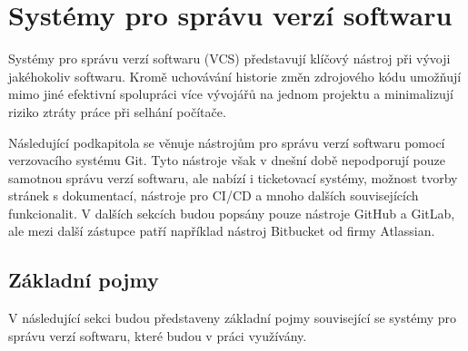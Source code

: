 \section{Systémy pro správu verzí softwaru}
Systémy pro správu verzí softwaru (VCS) představují klíčový nástroj při vývoji jakéhokoliv softwaru. Kromě uchovávání historie změn zdrojového kódu umožňují mimo jiné efektivní spolupráci více vývojářů na jednom projektu a minimalizují riziko ztráty práce při selhání počítače.

Následující podkapitola se věnuje nástrojům pro správu verzí softwaru pomocí verzovacího systému Git. Tyto nástroje však v dnešní době nepodporují pouze samotnou správu verzí softwaru, ale nabízí i ticketovací systémy, možnost tvorby stránek s dokumentací, nástroje pro CI/CD a mnoho dalších souvisejících funkcionalit. V dalších sekcích budou popsány pouze nástroje GitHub a GitLab, ale mezi další zástupce patří například nástroj Bitbucket od firmy Atlassian.

\subsection{Základní pojmy}
V následující sekci budou představeny základní pojmy související se systémy pro správu verzí softwaru, které budou v práci využívány.

